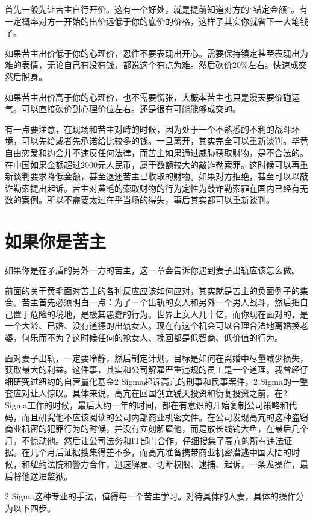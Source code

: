 首先一般先让苦主自行开价。这有一个好处，就是提前知道对方的“锚定金额”。有一定概率对方一开始的出价远低于你的底价的价格，这样子其实你就省下一大笔钱了。

如果苦主出价低于你的心理价，忍住不要表现出开心。需要保持镇定甚至表现出为难的表情，无论自己有没有钱，都说这个有点为难。然后砍价20\%左右。快速成交然后脱身。

如果苦主出价高于你的心理价，也不需要慌张，大概率苦主也只是漫天要价碰运气。可以直接砍价到心理价位左右。还是很有可能能够成交的。

有一点要注意，在现场和苦主对峙的时候，因为处于一个不熟悉的不利的战斗环境，可以先给或者先承诺给比较多的钱。一旦离开，其实完全可以重新谈判。毕竟自由恋爱和约会并不违反任何法律，而苦主如果通过威胁获取财物，是不合法的。在中国如果金额超过2000元人民币，属于数额较大的敲诈勒索罪。这时候可以再重新谈判要求降低金额，甚至退还苦主已收取的财物。如果对方拒绝，甚至可以以敲诈勒索提出起诉。苦主对黄毛的索取财物的行为定性为敲诈勒索罪在国内已经有无数的案例。所以不需要太过在乎当场的得失，事后其实都可以重新谈判。

\section{如果你是苦主}

如果你是在矛盾的另外一方的苦主，这一章会告诉你遇到妻子出轨应该怎么做。

前面的关于黄毛面对苦主的各种反应应该如何应对，其实就是苦主的负面例子的集合。苦主首先必须明白一点：为了一个出轨的女人和另外一个男人战斗，然后把自己置于危险的境地，是极其愚蠢的行为。世界上女人几十亿，而你现在面对的，是一个大龄、已婚、没有道德的出轨女人。现在有这个机会可以合理合法地离婚换老婆，何乐而不为？这时候任何的抢女人、挽回都是低智商、低价值的行为。

面对妻子出轨，一定要冷静，然后制定计划。目标是如何在离婚中尽量减少损失，获取最大的利益。这件事，其实和公司解雇严重违规的员工是一个道理。我曾经仔细研究过纽约的自营量化基金2 Sigma起诉高亢的刑事和民事案件，2 Sigma的一整套应对让人惊叹。具体来说，高亢在回国创立锐天投资和衍复投资之前，在2 Sigma工作的时候，最后大约一年的时间，都在有意识的开始复制公司策略和代码，而且研究他不应该阅读的公司内部商业机密文件。在公司发现高亢的这种盗窃商业机密的犯罪行为的时候，并没有立刻解雇他，而是放长线钓大鱼，在最后几个月，不惊动他。然后让公司法务和IT部门合作，仔细搜集了高亢的所有违法证据。在几个月后证据搜集得差不多，而高亢准备携带商业机密潜逃中国大陆的时候，和纽约法院和警方合作，迅速解雇、切断权限、逮捕、起诉，一条龙操作，最后将他送进监狱。

2 Sigma这种专业的手法，值得每一个苦主学习。对待具体的人妻，具体的操作分为以下四步。

